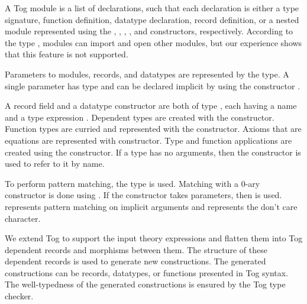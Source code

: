 A Tog module is a list of declarations, such that each declaration is either a type signature, function definition, datatype declaration, record definition, or a nested module represented using the  , , , , and  constructors, respectively. 
According to the type , modules can import and open other modules, but our experience shows that this feature is not supported. 

Parameters to modules, records, and datatypes are represented by the  type. A single parameter has type  and can be declared implicit by using the constructor . 

A record field and a datatype constructor are both of type , each having a name and a type expression . Dependent types are created with the  constructor. Function types are curried and represented with the  constructor. Axioms that are equations are represented with  constructor. Type and function applications are created using the  constructor. If a type has no arguments, then the  constructor is used to refer to it by name. 

To perform pattern matching, the  type is used. Matching with a $0$-ary constructor is done using . If the constructor takes parameters, then  is used.  represents pattern matching on implicit arguments and  represents the don't care \lstmath{$\_$} character. 

We extend Tog to support the input theory expressions and flatten them into Tog dependent records and morphisms between them. 
The structure of these dependent records is used to generate new constructions. The generated constructions can be records, datatypes, or functions presented in Tog syntax. The well-typedness of the generated constructions is ensured by the Tog type checker. 


